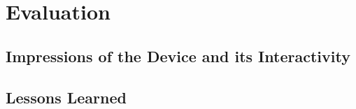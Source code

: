 \chapter{Evaluation}
\label{chap:evaluation}
\section{Impressions of the Device and its Interactivity}
\section{Lessons Learned}